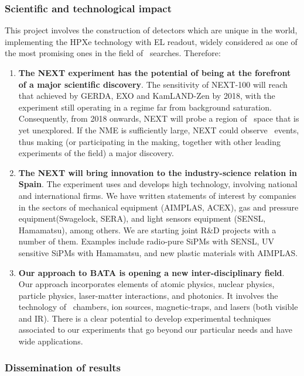 \subsubsection{Scientific and technological impact}

This project involves the construction of detectors which are unique in the world, implementing the HPXe technology with EL readout, widely considered as one of the most promising ones in the field of \bbonu\ searches. Therefore: 
\begin{enumerate}
\item {\bf The NEXT experiment has the potential of being at the forefront of a major scientific discovery}. The sensitivity of NEXT-100 will reach that achieved by GERDA, EXO and KamLAND-Zen by 2018, with the experiment still operating in a regime far from background saturation. Consequently, from 2018 onwards, NEXT will probe a region of \mbb\ space that is yet unexplored. If the NME is sufficiently large, NEXT could observe \bbonu\ events, thus making (or participating in the making, together with other leading experiments of the field) a major discovery.
\item {\bf The NEXT will bring innovation to the industry-science relation in Spain}. The experiment uses and develops high technology, involving national and international firms. We have written statements of interest by companies in the sectors of mechanical equipment (AIMPLAS, ACEX), gas and pressure equipment(Swagelock, SERA), and light sensors equipment (SENSL, Hamamatsu), among others. We are starting joint R\&D  projects with a number of them. Examples include radio-pure SiPMs with SENSL, UV sensitive SiPMs with Hamamatsu, and new plastic materials with AIMPLAS.  
\item {\bf Our approach to BATA is opening a new inter-disciplinary field}. Our approach incorporates elements of atomic physics, nuclear physics, particle physics, laser-matter interactions, and photonics. It involves the technology of \HPXE\ chambers, ion sources, magnetic-traps, and lasers (both visible and IR). There is a clear potential to develop experimental techniques associated to our experiments that go beyond our particular needs and have wide applications.
\end{enumerate}

\subsubsection{Dissemination of results}

